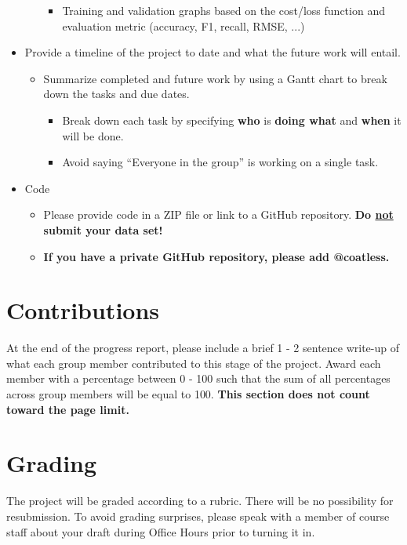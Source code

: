 \documentclass[conference]{IEEEtran}
\begin{document}
\begin{itemize}
\begin{itemize}
    \begin{itemize}
      \item Training and validation graphs based on the cost/loss function and evaluation metric (accuracy, F1, recall, RMSE, ...)
    \end{itemize}
  \end{itemize}
  \item Provide a timeline of the project to date and what the future work will entail.
  \begin{itemize}
    \item Summarize completed and future work by using a Gantt chart to break down the tasks and due dates.
    \begin{itemize}
      \item Break down each task by specifying \textbf{who} is \textbf{doing what} and \textbf{when} it will be done.
      \item Avoid saying ``Everyone in the group'' is working on a single task.
    \end{itemize}
  \end{itemize}
  \item Code
  \begin{itemize}
    \item Please provide code in a ZIP file or link to a GitHub repository. \textbf{Do \underline{not} submit your data set!}
    \item \textbf{If you have a private GitHub repository, please add @coatless.}
  \end{itemize}
\end{itemize}

\section{Contributions}

At the end of the progress report, please include a brief 1 - 2 sentence write-up of what each group member contributed to this stage of the project. Award each member with a percentage between 0 - 100 such that the sum of all percentages across group members will be equal to 100. \textbf{This section does not count toward the page limit.}

\section{Grading}

The project will be graded according to a rubric. There will be no possibility for resubmission. To avoid grading surprises, please speak with a member of course staff about your draft during Office Hours prior to turning it in.
\end{document}
